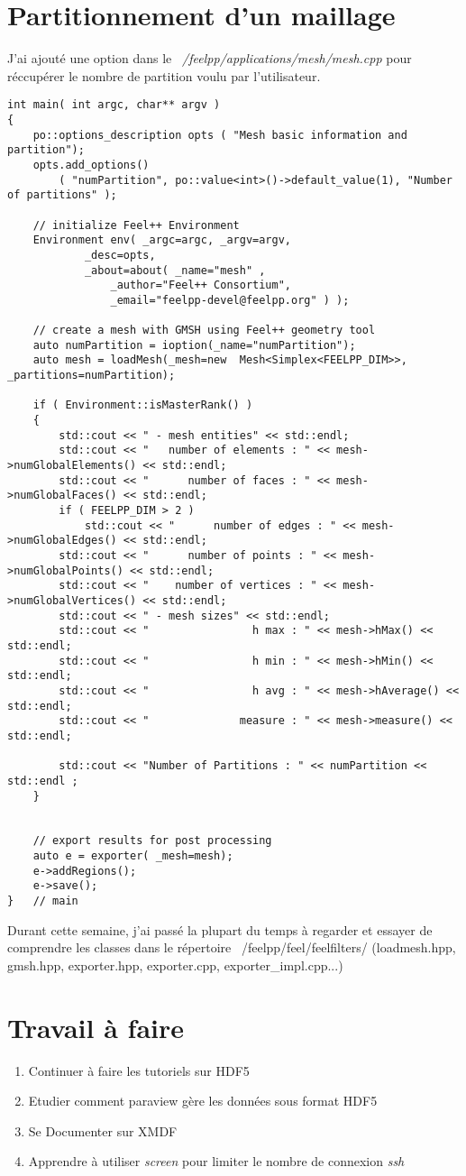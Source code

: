 \documentclass[12pt]{article}
\begin{document}
\section {Partitionnement d'un maillage}
J'ai ajouté une option dans le \emph{~/feelpp/applications/mesh/mesh.cpp} pour réccupérer le nombre de partition voulu par l'utilisateur.
\begin{lstlisting}
int main( int argc, char** argv )
{
    po::options_description opts ( "Mesh basic information and partition");
    opts.add_options()
        ( "numPartition", po::value<int>()->default_value(1), "Number of partitions" );

    // initialize Feel++ Environment
    Environment env( _argc=argc, _argv=argv,
            _desc=opts,
            _about=about( _name="mesh" ,
                _author="Feel++ Consortium",
                _email="feelpp-devel@feelpp.org" ) );

    // create a mesh with GMSH using Feel++ geometry tool
    auto numPartition = ioption(_name="numPartition");
    auto mesh = loadMesh(_mesh=new  Mesh<Simplex<FEELPP_DIM>>, _partitions=numPartition);

    if ( Environment::isMasterRank() )
    {
        std::cout << " - mesh entities" << std::endl;
        std::cout << "   number of elements : " << mesh->numGlobalElements() << std::endl;
        std::cout << "      number of faces : " << mesh->numGlobalFaces() << std::endl;
        if ( FEELPP_DIM > 2 )
            std::cout << "      number of edges : " << mesh->numGlobalEdges() << std::endl;  
        std::cout << "      number of points : " << mesh->numGlobalPoints() << std::endl;
        std::cout << "    number of vertices : " << mesh->numGlobalVertices() << std::endl;
        std::cout << " - mesh sizes" << std::endl;
        std::cout << "                h max : " << mesh->hMax() << std::endl;
        std::cout << "                h min : " << mesh->hMin() << std::endl;
        std::cout << "                h avg : " << mesh->hAverage() << std::endl;
        std::cout << "              measure : " << mesh->measure() << std::endl;

        std::cout << "Number of Partitions : " << numPartition << std::endl ;
    }


    // export results for post processing
    auto e = exporter( _mesh=mesh);
    e->addRegions();
    e->save();
}   // main
\end{lstlisting}
Durant cette semaine, j'ai passé la plupart du temps à regarder et essayer de comprendre les classes dans le répertoire ~/feelpp/feel/feelfilters/ (loadmesh.hpp, gmsh.hpp, exporter.hpp, exporter.cpp, exporter\_impl.cpp...)
\section {Travail à faire}
\begin{enumerate}
\item Continuer à faire les tutoriels sur HDF5
\item Etudier comment paraview gère les données sous format HDF5
\item Se Documenter sur XMDF
\item Apprendre à utiliser \emph{screen} pour limiter le nombre de connexion \emph{ssh} 

\end{enumerate}
\end{document}

